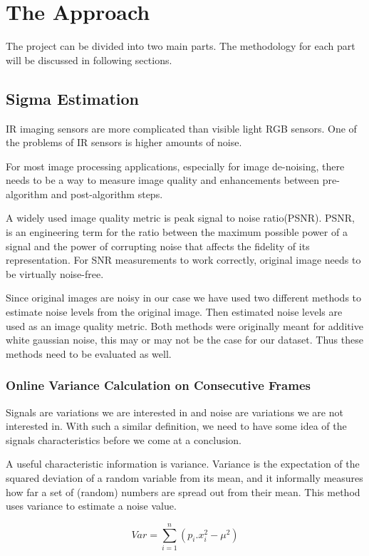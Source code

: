 \documentclass[10pt,twocolumn,letterpaper]{article}
\begin{document}
	
	\section{The Approach}
	The project can be divided into two main parts. The methodology for each part will be discussed in following sections.
	
	\subsection{Sigma Estimation}
	IR imaging sensors are more complicated than visible light RGB sensors. One of the problems of IR sensors is higher amounts of noise. 
	
	For most image processing applications, especially for image de-noising, there needs to be a way to measure image quality and enhancements between pre-algorithm and post-algorithm steps.
	
	A widely used image quality metric is peak signal to noise ratio(PSNR). PSNR, is an engineering term for the ratio between the maximum possible power of a signal and the power of corrupting noise that affects the fidelity of its representation\cite{wiki:psnr}. For SNR measurements to work correctly, original image needs to be virtually noise-free.
	
	Since original images are noisy in our case we have used two different methods to estimate noise levels from the original image. Then estimated noise levels are used as an image quality metric. Both methods were originally meant for additive white gaussian noise, this may or may not be the case for our dataset. Thus these methods need to be evaluated as well.
	\subsubsection{Online Variance Calculation on Consecutive Frames} \label{ss:online-var}
	Signals are variations we are interested in and noise are variations we are not interested in. With such a similar definition, we need to have some idea of the signals characteristics before we come at a conclusion. 
	
	A useful characteristic information is variance. Variance is the expectation of the squared deviation of a random variable from its mean, and it informally measures how far a set of (random) numbers are spread out from their mean\cite{wiki:variance}. This method uses variance to estimate a noise value.
	
	\begin{displaymath}
	Var = \sum_{i=1}^{n} (p_i.x^2_i - \mu^2)
	\end{displaymath}\label{eq:disc-var}
	
\end{document}
